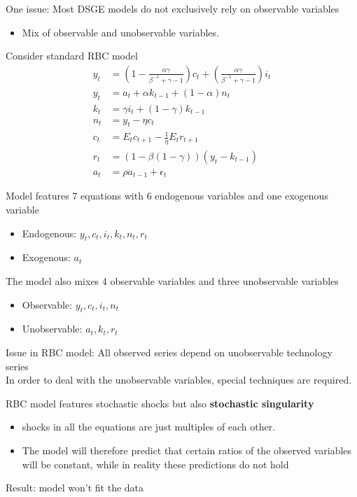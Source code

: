 \documentclass{beamer}
\begin{document}
\begin{frame}
  One issue: Most DSGE models do not exclusively rely on observable variables
  \begin{itemize}
    \item Mix of observable and unobservable variables. 
  \end{itemize}
  \medskip
  Consider standard RBC model
\begin{align*}
  y_t &= \left(1-\frac{\alpha \gamma}{\beta^{-1}+\gamma -1}\right)c_t +
  \left(\frac{\alpha \gamma}{\beta^{-1}+\gamma-1}\right)i_t\\
  y_t &= a_t +\alpha k_{t-1} + (1-\alpha)n_t\\
  k_t &= \gamma i_t + (1-\gamma)k_{t-1}\\
  n_t &= y_t-\eta c_t\\
  c_t &= E_t c_{t+1} - \frac{1}{\eta}E_t r_{t+1}\\
  r_t &= (1-\beta(1-\gamma))(y_t-k_{t-1})\\
  a_t &= \rho a_{t-1} + \epsilon_t
\end{align*}
\end{frame}

\begin{frame}
  Model features 7 equations with 6 endogenous variables and one exogenous variable
\begin{itemize}
  \item Endogenous: $y_t,c_t,i_t,k_t,n_t,r_t$
  \item Exogenous: $a_t$
\end{itemize}
\medskip
The model also mixes 4 observable variables and three unobservable variables
\begin{itemize}
  \item Observable: $y_t,c_t,i_t,n_t$
  \item Unobservable: $a_t, k_t, r_t$
\end{itemize}
Issue in RBC model: All observed series depend on unobservable technology series\\
In order to deal with the unobservable variables, special techniques are required. 
\end{frame}

\begin{frame}
  RBC model features stochastic shocks but also \textbf{stochastic singularity}
  \begin{itemize}
    \item shocks in all the equations are just multiples of each other. 
    \item The model will therefore predict that certain ratios of the observed variables will be constant, while in reality these predictions do not hold    
  \end{itemize}
  Result: model won't fit the data
\end{frame}
\end{document}

